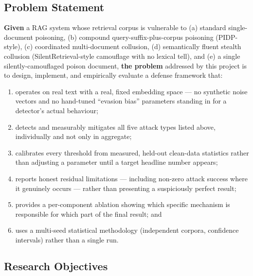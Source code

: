 \subsection{Problem Statement}

\textbf{Given} a RAG system whose retrieval corpus is vulnerable to (a)
standard single-document poisoning, (b) compound query-suffix-plus-corpus
poisoning (PIDP-style), (c) coordinated multi-document collusion, (d)
semantically fluent stealth collusion (SilentRetrieval-style camouflage
with no lexical tell), and (e) a single silently-camouflaged poison
document, \textbf{the problem} addressed by this project is to design,
implement, and empirically evaluate a defense framework that:

\begin{enumerate}
\item operates on real text with a real, fixed embedding space --- no
  synthetic noise vectors and no hand-tuned ``evasion bias'' parameters
  standing in for a detector's actual behaviour;
\item detects and measurably mitigates all five attack types listed
  above, individually and not only in aggregate;
\item calibrates every threshold from measured, held-out clean-data
  statistics rather than adjusting a parameter until a target headline
  number appears;
\item reports honest residual limitations --- including non-zero attack
  success where it genuinely occurs --- rather than presenting a
  suspiciously perfect result;
\item provides a per-component ablation showing which specific mechanism
  is responsible for which part of the final result; and
\item uses a multi-seed statistical methodology (independent corpora,
  confidence intervals) rather than a single run.
\end{enumerate}

\subsection{Research Objectives}
\label{sec:objectives}

